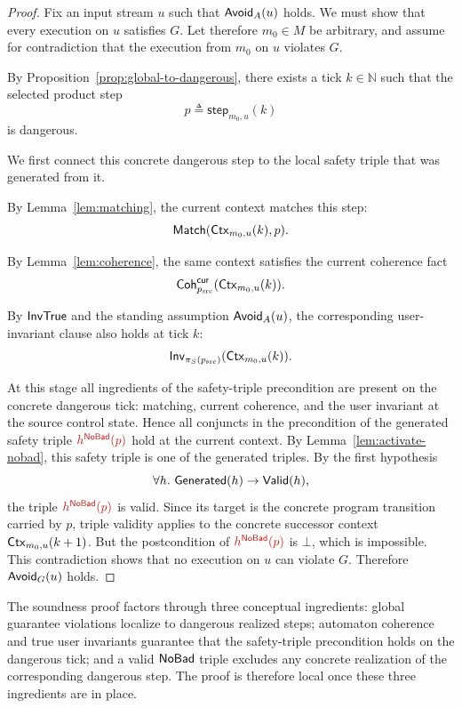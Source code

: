 \documentclass[acmsmall,screen]{acmart}
\theoremstyle{leftplain}
\theoremstyle{leftdefinition}
\theoremstyle{leftremark}
\begin{document}
\begin{proof}
Fix an input stream $u$ such that $\mathsf{Avoid}_A(u)$ holds. We must show that every
execution on $u$ satisfies $G$. Let therefore $m_0 \in M$ be arbitrary, and
assume for contradiction that the execution from $m_0$ on $u$ violates $G$.

By Proposition~\ref{prop:global-to-dangerous}, there exists a tick
$k \in \mathbb{N}$ such that the selected product step
\[
  p \triangleq \mathsf{step}_{m_0,u}(k)
\]
is dangerous.

We first connect this concrete dangerous step to the local safety triple that
was generated from it.

By Lemma~\ref{lem:matching}, the current context matches this step:
\[
  \mathsf{Match}(\mathsf{Ctx}_{m_0,u}(k),p).
\]

By Lemma~\ref{lem:coherence}, the same context satisfies the current coherence
fact
\[
  \mathsf{Coh}^{\mathsf{cur}}_{p_{\mathrm{src}}}(\mathsf{Ctx}_{m_0,u}(k)).
\]

By $\mathsf{InvTrue}$ and the standing assumption $\mathsf{Avoid}_A(u)$, the corresponding
user-invariant clause also holds at tick $k$:
\[
  \mathsf{Inv}_{\pi_S(p_{\mathrm{src}})}(\mathsf{Ctx}_{m_0,u}(k)).
\]

At this stage all ingredients of the safety-triple precondition are present on
the concrete dangerous tick: matching, current coherence, and the user
invariant at the source control state. Hence all conjuncts in the precondition
of the generated safety triple
$\triplesafe{h^{\NoBad}(p)}$ hold at the current context. By
Lemma~\ref{lem:activate-nobad}, this safety triple is one of the generated
triples. By the first hypothesis
\[
  \forall h.\ \mathsf{Generated}(h) \rightarrow \mathsf{Valid}(h),
\]
the triple $\triplesafe{h^{\NoBad}(p)}$ is valid. Since its target is the concrete program
transition carried by $p$, triple validity applies to the concrete successor
context $\mathsf{Ctx}_{m_0,u}(k+1)$. But the postcondition of $\triplesafe{h^{\NoBad}(p)}$ is
$\bot$, which is impossible. This contradiction shows that no execution on $u$
can violate $G$. Therefore $\mathsf{Avoid}_G(u)$ holds.
\end{proof}

The soundness proof factors through three conceptual ingredients: global
guarantee violations localize to dangerous realized steps; automaton coherence
and true user invariants guarantee that the safety-triple precondition holds on
the dangerous tick; and a valid $\mathsf{NoBad}$ triple excludes any concrete
realization of the corresponding dangerous step. The proof is therefore local
once these three ingredients are in place.
\end{document}
